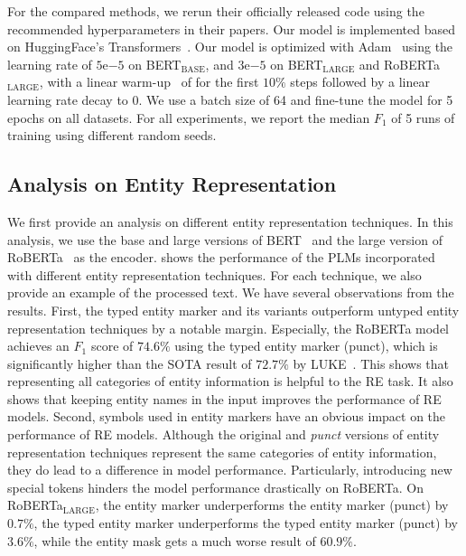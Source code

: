 \documentclass[11pt,a4paper]{article}
\newcommand{\stitle}[1]{\vspace{0.3em}\noindent{\bf #1}}
\begin{document}
\stitle{Model configurations.}
For the compared methods, we rerun their officially released code using the recommended hyperparameters in their papers.
Our model is implemented based on HuggingFace's Transformers~\cite{wolf-etal-2020-transformers}.
Our model is optimized with Adam~\cite{Kingma2015AdamAM} using the learning rate of $5\mathrm{e}{-5}$ on BERT$_\text{BASE}$, and $3\mathrm{e}{-5}$ on BERT$_\text{LARGE}$ and RoBERTa$_\text{LARGE}$, with a linear warm-up~\cite{Goyal2017AccurateLM} of for the first $10\%$ steps followed by a linear learning rate decay to 0.
We use a batch size of 64 and fine-tune the model for 5 epochs on all datasets.
For all experiments, we report the median $F_1$ of 5 runs of training using different random seeds.

\subsection{Analysis on Entity Representation}\label{ssec:exp_rep}


We first provide an analysis on different entity representation techniques. In this analysis, we use the base and large versions of BERT~\cite{devlin-etal-2019-bert} and the large version of RoBERTa~\cite{liu2019roberta} as the encoder.
 shows the performance of the PLMs incorporated with different entity representation techniques.
For each technique, we also provide an example of the processed text.
We have several observations from the results.
First, the typed entity marker and its variants outperform untyped entity representation techniques by a notable margin.
Especially, the RoBERTa model achieves an $F_1$ score of $74.6\%$ using the typed entity marker (punct), which is significantly higher than the SOTA result of $72.7\%$ by LUKE~\cite{yamada-etal-2020-luke}.
This shows that representing all categories of entity information is helpful to the RE task.
It also shows that keeping entity names in the input improves the performance of RE models.
Second, symbols used in entity markers have an obvious impact on the performance of RE models.
Although the original and \emph{punct} versions of entity representation techniques represent the same categories of entity information, they do lead to a difference in model performance.
Particularly, introducing new special tokens hinders the model performance drastically on RoBERTa.
On RoBERTa$_\text{LARGE}$, the entity marker underperforms the entity marker (punct) by $0.7\%$, the typed entity marker underperforms the typed entity marker (punct) by $3.6\%$, while the entity mask gets a much worse result of $60.9\%$.
\end{document}

